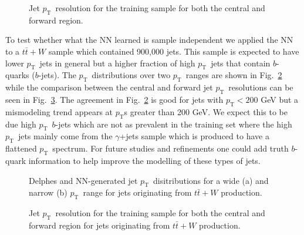 \documentclass[showpacs,showkeys,preprint,prd,nofootinbib,linenumbers,12pt,superscriptaddress]{revtex4-1}
\def\pt{\ensuremath{p_{\mathrm{T}}}}
\begin{document}
\begin{figure}[htb]
  \caption{Jet \pt\ resolution for the training sample for both the central and forward region. }
  \label{fig:nnRes}
\end{figure}

To test whether what the NN learned is sample independent we applied the NN to a $t\bar{t}+W$ sample which contained 900,000 jets. This sample is expected to have lower \pt\ jets in general but a higher fraction of high \pt\ jets that contain $b$-quarks ($b$-jets). The \pt\ distributions over two \pt\ ranges are shown in Fig.~\ref{fig:pTNNVsDelphes_ttW} while the comparison between the central and forward jet \pt\ resolutions can be seen in Fig.~\ref{fig:nnRes_ttW}. The agreement in Fig.~\ref{fig:pTNNVsDelphes_ttW} is good for jets with $\pt<200$ GeV but a mismodeling trend appears at \pt s greater than 200 GeV. We expect this to be due high \pt\ $b$-jets which are not as prevalent in the training set where the high \pt\ jets mainly come from the $\gamma$+jets sample which is produced to have a flattened \pt\ spectrum. For future studies and refinements one could add truth $b$-quark information to help improve the modelling of these types of jets.  


\begin{figure}[htb]
  \caption{Delphes and NN-generated jet \pt\ disitributions for a wide (a) and narrow (b) \pt\ range for jets originating from $t\bar{t}+W$ production.}
  \label{fig:pTNNVsDelphes_ttW}
\end{figure}


\begin{figure}[htb]
  \caption{Jet \pt\ resolution for the training sample for both the central and forward region for jets originating from $t\bar{t}+W$ production.}
  \label{fig:nnRes_ttW}
\end{figure}
\end{document}
